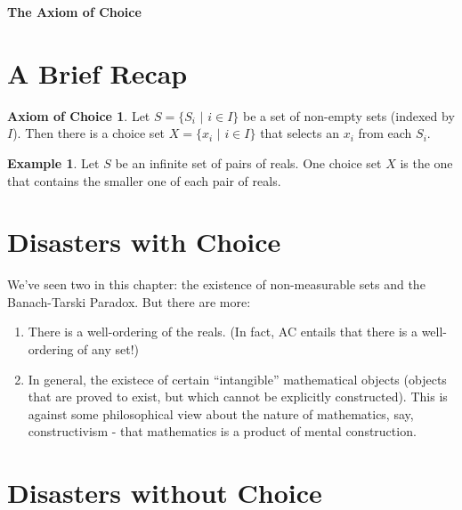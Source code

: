 \documentclass[11pt]{article}
\theoremstyle{definition}
\newtheorem*{axm}{Axiom of Choice}
\newtheorem{exm}{Example}
\begin{document}




\begin{center}
{\LARGE \bf The Axiom of Choice}
\end{center}

\smallskip

\section{A Brief Recap}

\begin{axm}
Let $S = \{S_i \, \, | \, \, i \in I \}$ be a set of non-empty sets (indexed by $I$). Then there is a choice set $X = \{x_i \, \, | \, \, i \in I\}$ that selects an $x_i$ from each $S_i$.
\end{axm}

\begin{exm}
Let $S$ be an infinite set of pairs of reals. One choice set $X$ is the one that contains the smaller one of each pair of reals.
\end{exm}

\section{Disasters with Choice}

We've seen two in this chapter: the existence of non-measurable sets and the Banach-Tarski Paradox. But there are more:

\begin{enumerate}
\item There is a well-ordering of the reals. (In fact, AC entails that there is a well-ordering of any set!)
\item In general, the existece of certain ``intangible'' mathematical objects (objects that are proved to exist, but which cannot be explicitly constructed). This is against some philosophical view about the nature of mathematics, say, constructivism - that mathematics is a product of mental construction.

\end{enumerate}

\section{Disasters without Choice}
\end{document}
